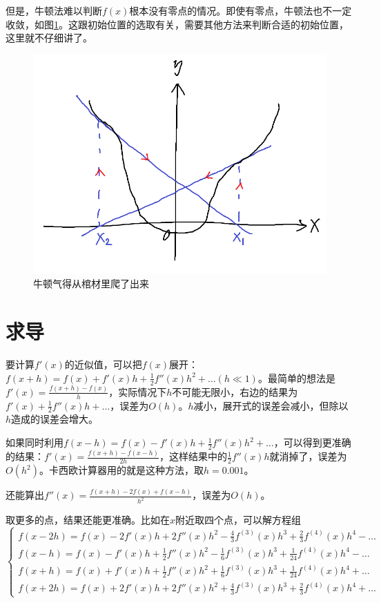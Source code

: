 但是，牛顿法难以判断$f(x)$根本没有零点的情况。即使有零点，牛顿法也不一定收敛，如图\ref{fig-newton-iter-boom}。这跟初始位置的选取有关，需要其他方法来判断合适的初始位置，这里就不仔细讲了。
\begin{figure}[htb]
\centering
\includegraphics[scale=0.5]{fig/newton-iter-boom.png}
\caption{牛顿气得从棺材里爬了出来}
\label{fig-newton-iter-boom}
\end{figure}
\section{求导}
要计算$f'(x)$的近似值，可以把$f(x)$展开：$f(x+h)=f(x)+f'(x) h+\frac{1}{2} f''(x) h^2+\dots(h \ll 1)$。最简单的想法是$f'(x)=\frac{f(x+h)-f(x)}{h}$，实际情况下$h$不可能无限小，右边的结果为$f'(x)+\frac{1}{2} f''(x) h+\dots$，误差为$O(h)$。$h$减小，展开式的误差会减小，但除以$h$造成的误差会增大。

如果同时利用$f(x-h)=f(x)-f'(x) h+\frac{1}{2} f''(x) h^2+\dots$，可以得到更准确的结果：$f'(x)=\frac{f(x+h)-f(x-h)}{2 h}$，这样结果中的$\frac{1}{2} f''(x) h$就消掉了，误差为$O(h^2)$。卡西欧计算器用的就是这种方法，取$h=0.001$。

还能算出$f''(x)=\frac{f(x+h)-2 f(x)+f(x-h)}{h^2}$，误差为$O(h)$。

取更多的点，结果还能更准确。比如在$x$附近取四个点，可以解方程组
\begin{equation*}
\begin{cases}
f(x-2 h)=f(x)-2 f'(x) h+2 f''(x) h^2-\frac{4}{3} f^{(3)}(x) h^3+\frac{2}{3} f^{(4)}(x) h^4-\dots \\
f(x-h)=f(x)-f'(x) h+\frac{1}{2} f''(x) h^2-\frac{1}{6} f^{(3)}(x) h^3+\frac{1}{24} f^{(4)}(x) h^4-\dots \\
f(x+h)=f(x)+f'(x) h+\frac{1}{2} f''(x) h^2+\frac{1}{6} f^{(3)}(x) h^3+\frac{1}{24} f^{(4)}(x) h^4+\dots \\
f(x+2 h)=f(x)+2 f'(x) h+2 f''(x) h^2+\frac{4}{3} f^{(3)}(x) h^3+\frac{2}{3} f^{(4)}(x) h^4+\dots
\end{cases}
\end{equation*}

